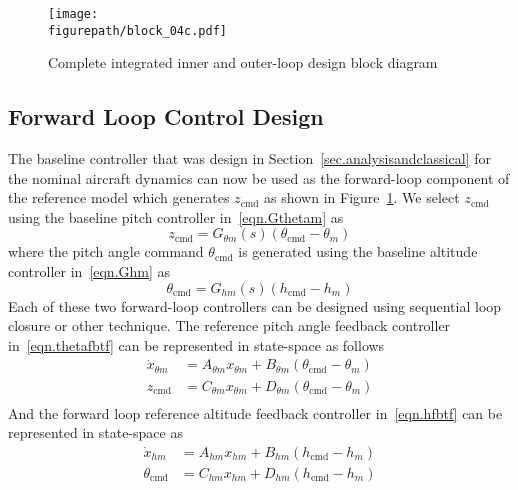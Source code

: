 \documentclass[]{../sty/aiaa-tc}
\newcommand{\figurepath}{../fig}
\theoremstyle{examplestyle}
\begin{document}
  \begin{figure}[H]
    \begin{center}
      \texttt{[image: \\figurepath/block\_04c.pdf]}
      \vspace{-0.1in}
      \caption{Complete integrated inner and outer-loop design block diagram\label{fig.inner_outer_full}}
    \end{center}
  \end{figure}

  \subsection{Forward Loop Control Design}

  The baseline controller that was design in Section~\ref{sec.analysisandclassical} for the nominal aircraft dynamics can now be used as the forward-loop component of the reference model which generates $z_{\text{cmd}}$ as shown in Figure~\ref{fig.inner_outer_full}.
  We select $z_{\text{cmd}}$ using the baseline pitch controller in\ \eqref{eqn.Gthetam} as
  \begin{equation}
    \label{eqn.thetafbtf}
    z_{\text{cmd}} = G_{\theta m}(s)(\theta_{\text{cmd}}-\theta_{m})
  \end{equation}
  where the pitch angle command $\theta_{\text{cmd}}$ is generated using the baseline altitude controller in\ \eqref{eqn.Ghm} as
  \begin{equation}
    \label{eqn.hfbtf}
    \theta_{\text{cmd}} = G_{hm}(s)(h_{\text{cmd}}-h_{m})
  \end{equation}
  Each of these two forward-loop controllers can be designed using sequential loop closure or other technique.
  The reference pitch angle feedback controller in\ \eqref{eqn.thetafbtf} can be represented in state-space as follows
  \begin{equation}
    \label{eqn.thetafbss}
    \begin{split}
      \dot{x}_{\theta m} &= A_{\theta m}x_{\theta m} + B_{\theta m}(\theta_{\text{cmd}} - \theta_{m}) \\
      z_{\text{cmd}} &= C_{\theta m}x_{\theta m} + D_{\theta m}(\theta_{\text{cmd}} - \theta_{m}) \\
    \end{split}
  \end{equation}
  And the forward loop reference altitude feedback controller in\ \eqref{eqn.hfbtf} can be represented in state-space as
  \begin{equation}
    \label{eqn.hfbss}
    \begin{split}
      \dot{x}_{hm} &= A_{hm}x_{hm} + B_{hm}(h_{\text{cmd}} - h_{m}) \\
      \theta_{\text{cmd}} &= C_{hm}x_{hm} + D_{hm}(h_{\text{cmd}} - h_{m}) \\
    \end{split}
  \end{equation}
\end{document}
